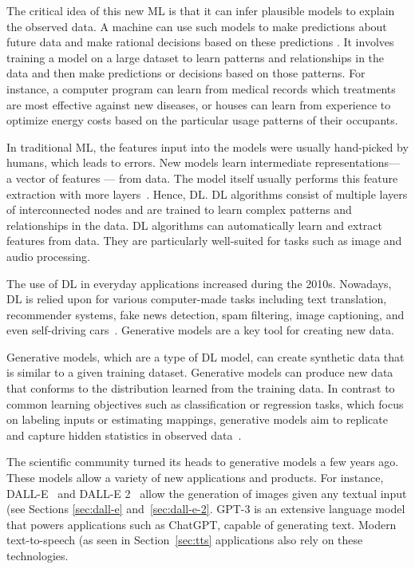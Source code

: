 The critical idea of this new \ac{ML} is that it can infer plausible models to explain the observed data. A machine can use such models to make predictions about future data and make rational decisions based on these predictions \cite{ghahramani_probabilistic_2015}. It involves training a model on a large dataset to learn patterns and relationships in the data and then make predictions or decisions based on those patterns. For instance, a computer program can learn from medical records which treatments are most effective against new diseases, or houses can learn from experience to optimize energy costs based on the particular usage patterns of their occupants.

In traditional \ac{ML}, the features input into the models were usually hand-picked by humans, which leads to errors. New models learn intermediate representations— a vector of features — from data. The model itself usually performs this feature extraction with more layers~\cite{goodfellow_deep_2016}. Hence, \acf{DL}. \Ac{DL} algorithms consist of multiple layers of interconnected nodes and are trained to learn complex patterns and relationships in the data. \Ac{DL} algorithms can automatically learn and extract features from data. They are particularly well-suited for tasks such as image and audio processing.

The use of \ac{DL} in everyday applications increased during the 2010s. Nowadays, \ac{DL} is relied upon for various computer-made tasks including text translation, recommender systems, fake news detection, spam filtering, image captioning, and even self-driving cars~\cite{dean_golden_2022}.  Generative models are a key tool for creating new data.

Generative models, which are a type of \ac{DL} model, can create synthetic data that is similar to a given training dataset. Generative models can produce new data that conforms to the distribution learned from the training data. In contrast to common learning objectives such as classification or regression tasks, which focus on labeling inputs or estimating mappings, generative models aim to replicate and capture hidden statistics in observed data~\cite{huzaifah_deep_2021}.

The scientific community turned its heads to generative models a few years ago. These models allow a variety of new applications and products. For instance, DALL-E~\cite{ramesh_zero-shot_2021} and DALL-E 2~\cite{ramesh_hierarchical_2022} allow the generation of images given any textual input (see Sections \ref{sec:dall-e} and~\ref{sec:dall-e-2}. GPT-3 is an extensive language model \cite{brown_language_2020} that powers applications such as ChatGPT, capable of generating text. Modern text-to-speech (as seen in Section~\ref{sec:tts} applications also rely on these technologies.

